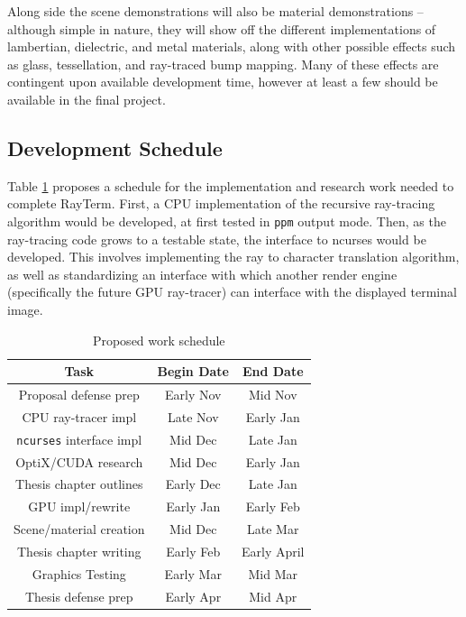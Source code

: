 \documentclass[11pt]{article}
\newcommand{\name}{{\sc RayTerm}}
\begin{document}
Along side the scene demonstrations will also be material demonstrations -- although simple in nature, they will show off the different implementations of lambertian, dielectric, and metal materials, along with other possible effects such as glass, tessellation, and ray-traced bump mapping.
Many of these effects are contingent upon available development time, however at least a few should be available in the final project.

\subsection{Development Schedule}
\label{sec:schedule}


Table \ref{worktable} proposes a schedule for the implementation and research work needed to complete \name.
First, a CPU implementation of the recursive ray-tracing algorithm would be developed, at first tested in \texttt{ppm} output mode.
Then, as the ray-tracing code grows to a testable state, the interface to ncurses would be developed.
This involves implementing the ray to character translation algorithm, as well as standardizing an interface with which another render engine (specifically the future GPU ray-tracer) can interface with the displayed terminal image.

\begin{table}[htb]
  \vspace*{0.6em}
  \centering
  \begin{tabular}{|c||c|c|}
    \hline
    \textbf{Task} & \textbf{Begin Date} & \textbf{End Date} \\\hline\hline
    Proposal defense prep & Early Nov & Mid Nov \\\hline
    CPU ray-tracer impl & Late Nov & Early Jan \\\hline
    \texttt{ncurses} interface impl & Mid Dec & Late Jan \\\hline
    OptiX/CUDA research & Mid Dec & Early Jan \\\hline
    Thesis chapter outlines & Early Dec & Late Jan \\\hline
    GPU impl/rewrite & Early Jan & Early Feb \\\hline
    Scene/material creation & Mid Dec & Late Mar \\\hline
    Thesis chapter writing & Early Feb & Early April \\\hline
    Graphics Testing & Early Mar & Mid Mar \\\hline
    Thesis defense prep & Early Apr & Mid Apr \\\hline
  \end{tabular}
  \caption{Proposed work schedule}
  \label{worktable}
\end{table}
\end{document}
